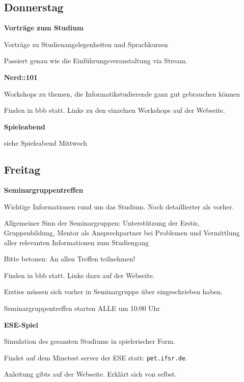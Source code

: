 \documentclass[a4paper,12pt]{scrreprt}
\begin{document}
\subsection{Donnerstag}
\textbf{Vorträge zum Studium}
\begin{itemize*}
    \item Vorträge zu Studienangelegenheiten und Sprachkursen
    \item Passiert genau wie die Einführungsveranstaltung via Stream.
\end{itemize*}

\textbf{Nerd::101}
\begin{itemize*}
    \item Workshops zu themen, die Informatikstudierende ganz gut gebrauchen können
    \item Finden in bbb statt. Links zu den einzelnen Workshops auf der Webseite.
\end{itemize*}

\textbf{Spieleabend}
\begin{itemize*}
    \item siehe Spieleabend Mittwoch
\end{itemize*}


\subsection{Freitag}
\textbf{Seminargruppentreffen}
\begin{itemize*}
    \item Wichtige Informationen rund um das Studium. Noch detaillierter als vorher.
    \item Allgemeiner Sinn der Seminargruppen: Unterstützung der Erstis, Gruppenbildung, Mentor als Ansprechpartner bei Problemen und Vermittlung aller relevanten Informationen zum Studiengang
    \item Bitte betonen: An allen Treffen teilnehmen!
    \item Finden in bbb statt. Links dazu auf der Webseite.
    \item Ersties müssen sich vorher in Seminargruppe über  eingeschrieben haben.
    \item Seminargruppentreffen starten ALLE um 10:00 Uhr
\end{itemize*}

\textbf{ESE-Spiel}
\begin{itemize*}
    \item Simulation des gesamten Studiums in spielerischer Form.
    \item Findet auf dem Minetest server der ESE statt: \texttt{pet.ifsr.de}.
    \item Anleitung gibts auf der Webseite. Erklärt sich von selbst.
\end{itemize*}
\end{document}
